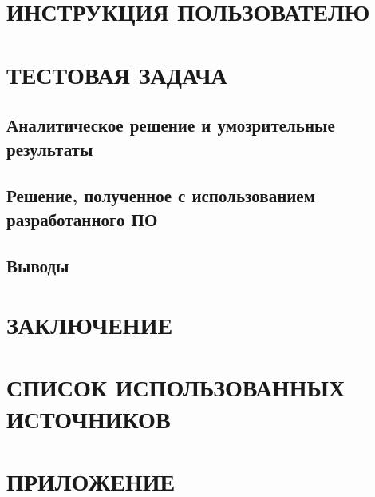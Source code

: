 \section{ИНСТРУКЦИЯ ПОЛЬЗОВАТЕЛЮ}
\section{ТЕСТОВАЯ ЗАДАЧА}
\subsection{Аналитическое решение и умозрительные результаты}
\subsection{Решение, полученное с использованием разработанного ПО}
\subsection{Выводы}
\section*{ЗАКЛЮЧЕНИЕ}
\section*{СПИСОК ИСПОЛЬЗОВАННЫХ ИСТОЧНИКОВ}
\section*{ПРИЛОЖЕНИЕ}

